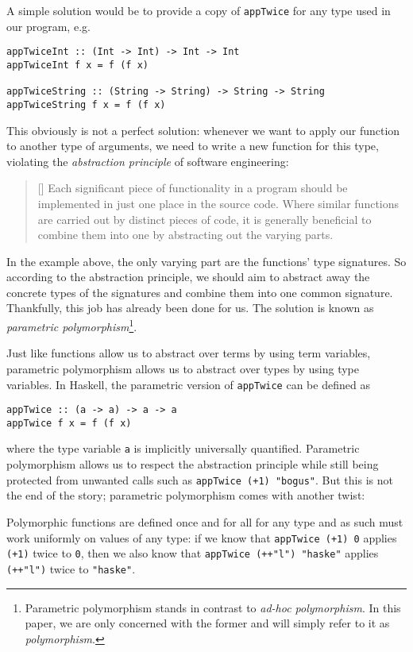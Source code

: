 \documentclass[12pt]{article}
\theoremstyle{plain}
\theoremstyle{definition}
\begin{document}
A simple solution would be to provide a copy of
\texttt{appTwice} for any type used in our program, e.g.\
\begin{verbatim}
appTwiceInt :: (Int -> Int) -> Int -> Int
appTwiceInt f x = f (f x)

appTwiceString :: (String -> String) -> String -> String
appTwiceString f x = f (f x)
\end{verbatim}
This obviously is not a perfect solution:
whenever we want to apply our function to another type of arguments,
we need to write a new function for this type,
violating the \emph{abstraction principle} of software engineering:
\begin{quote}[\citet{typesprogramming}]
Each significant piece of functionality in a program should be implemented in just one place in the source code. Where similar functions are carried out by distinct pieces of code, it is generally beneficial to combine them into one by abstracting out the varying parts.
\end{quote}
In the example above, the only varying part are the functions' type signatures.
So according to the abstraction principle, we should aim to abstract away the concrete types of the signatures and combine them into one common signature.
Thankfully, this job has already been done for us.
The solution is known as \emph{parametric polymorphism}\footnote{Parametric polymorphism stands in contrast to \emph{ad-hoc polymorphism}. In this paper, we are only concerned with the former and will simply refer to it as \emph{polymorphism}.}.

Just like functions allow us to abstract over terms by using term variables,
parametric polymorphism allows us to abstract over types by using type variables.
In Haskell, the parametric version of \texttt{appTwice} can be defined as
\begin{verbatim}
appTwice :: (a -> a) -> a -> a
appTwice f x = f (f x)
\end{verbatim}
where the type variable \texttt{a} is implicitly universally quantified.
Parametric polymorphism allows us to respect the abstraction principle while still being protected from unwanted calls such as \texttt{appTwice (+1) "bogus"}.
But this is not the end of the story;
parametric polymorphism comes with another twist:

Polymorphic functions are defined once and for all for any type and as such must work uniformly on values of any type:
if we know that \texttt{appTwice (+1) 0} applies \texttt{(+1)} twice to \texttt{0}, then we also know that \texttt{appTwice (++"l") "haske"} applies \texttt{(++"l")} twice to \texttt{"haske"}.
\end{document}
